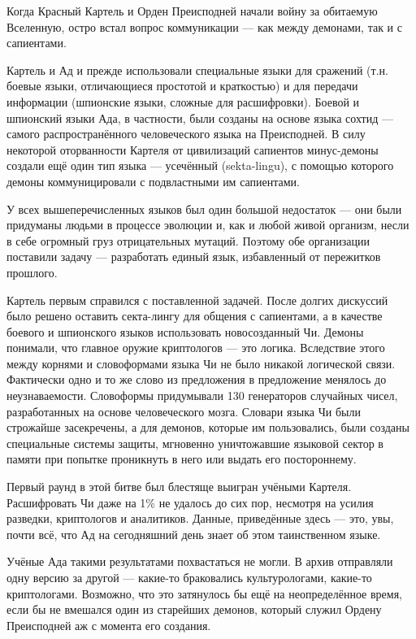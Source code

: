 \documentclass[a4paper,10pt]{book}
\begin{document}
Когда Красный Картель и Орден Преисподней начали войну за обитаемую Вселенную, 
остро встал вопрос коммуникации --- как между демонами, так и с сапиентами.

Картель и Ад и прежде использовали специальные языки для сражений (т.н. боевые 
языки, отличающиеся простотой и краткостью) и для передачи информации 
(шпионские языки, сложные для расшифровки). Боевой и шпионский языки Ада, в 
частности, были созданы на основе языка сохтид --- самого распространённого 
человеческого языка на Преисподней. В силу некоторой оторванности Картеля от 
цивилизаций сапиентов минус-демоны создали ещё один тип языка --- усечённый 
(sekta-lingu), с помощью которого демоны коммуницировали с подвластными им 
сапиентами.

У всех вышеперечисленных языков был один большой недостаток --- они были 
придуманы людьми в процессе эволюции и, как и любой живой организм, несли в 
себе огромный груз отрицательных мутаций. Поэтому обе организации поставили 
задачу --- разработать единый язык, избавленный от пережитков прошлого.

Картель первым справился с поставленной задачей. После долгих дискуссий было 
решено оставить секта-лингу для общения с сапиентами, а в качестве боевого и 
шпионского языков использовать новосозданный Чи. Демоны понимали, что главное 
оружие криптологов --- это логика. Вследствие этого между корнями и 
словоформами языка Чи не было никакой логической связи. Фактически одно и то же 
слово из предложения в предложение менялось до неузнаваемости. Словоформы 
придумывали 130 генераторов случайных чисел, разработанных на основе 
человеческого мозга. Словари языка Чи были строжайше засекречены, а для 
демонов, которые им пользовались, были созданы специальные системы защиты, 
мгновенно уничтожавшие языковой сектор в памяти при попытке проникнуть в него 
или выдать его постороннему.

Первый раунд в этой битве был блестяще выигран учёными Картеля. Расшифровать Чи 
даже на 1\% не удалось до сих пор, несмотря на усилия разведки, криптологов и 
аналитиков. Данные, приведённые здесь --- это, увы, почти всё, что Ад на 
сегодняшний день знает об этом таинственном языке.

Учёные Ада такими результатами похвастаться не могли. В архив отправляли одну 
версию за другой --- какие-то браковались культурологами, какие-то 
криптологами. Возможно, что это затянулось бы ещё на неопределённое время, если 
бы не вмешался один из старейших демонов, который служил Ордену Преисподней аж 
с момента его создания.
\end{document}
